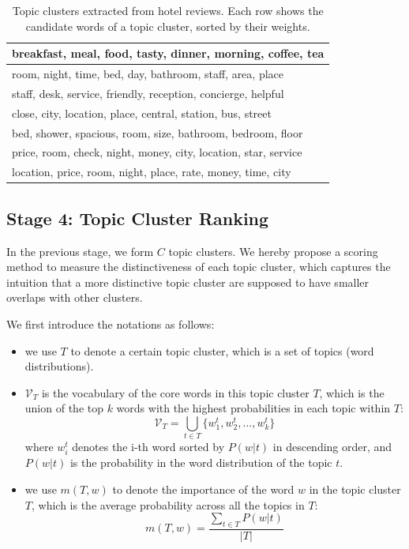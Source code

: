 \begin{table}[t]
\caption{Topic clusters extracted from hotel reviews.
Each row shows the candidate words of a topic cluster, sorted by their weights.}
\label{table:step3}
\small
\centering
\begin{tabular}{|l|} \hline
breakfast, meal, food, tasty, dinner, morning, coffee, tea \\\hline
room, night, time, bed, day, bathroom, staff, area, place \\\hline
staff, desk, service, friendly, reception, concierge, helpful \\\hline
close, city, location, place, central, station, bus, street\\\hline
bed, shower, spacious, room, size, bathroom, bedroom, floor \\\hline
price, room, check, night, money, city, location, star, service \\\hline
location, price, room, night, place, rate, money, time, city  \\\hline
\end{tabular}
\end{table}


\subsection{Stage 4: Topic Cluster Ranking}
\label{sec:topicCluster}
In the previous stage, we form $C$ topic clusters.  
We hereby propose a scoring method to measure the distinctiveness of 
each topic cluster, which captures the intuition that a more 
distinctive topic cluster are supposed to have smaller overlaps 
with other clusters. 

We first introduce the notations as follows:
\begin{itemize}
	\item we use $T$ to denote a certain topic cluster, which is a set of topics (word distributions). 
	\item $\mathcal{V}_T$ is the vocabulary of the core words in this topic cluster $T$, which is the union of the top $k$ words with the highest probabilities in each topic within $T$:
	\begin{equation}
	 \mathcal{V}_T =  \bigcup_{t\in T} \{w_1^{t},w_2^{t},...,w_k^{t}\} 
	\end{equation}
	where $w_i^t$ denotes the i-th word sorted by $P(w|t)$ in descending order, and $P(w|t)$ is the probability in the word distribution of the topic $t$.
	\item we use $m(T, w)$ to denote the importance of the word $w$ in the topic cluster $T$, which is the average probability across all the topics in $T$:
	\begin{equation}
	m(T,w) = \frac{\sum_{t\in T} P(w|t) }{|T|}
	\end{equation}
\end{itemize}


